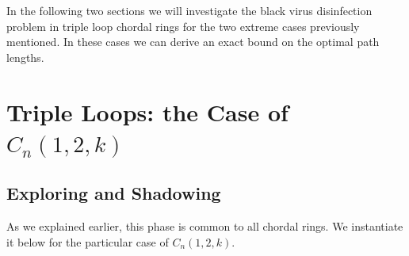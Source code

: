 




 In the following two sections we will investigate the black virus disinfection problem in  triple loop chordal rings for the two extreme cases previously mentioned. In these cases we can derive an exact bound on the optimal path lengths.




\section{Triple Loops: the Case of $C_n(1,2,k)$ }
\subsection{Exploring and Shadowing}
As we explained earlier, this phase is common to all chordal rings. We instantiate it below for the particular case of   $C_n(1,2,k)$.
%


